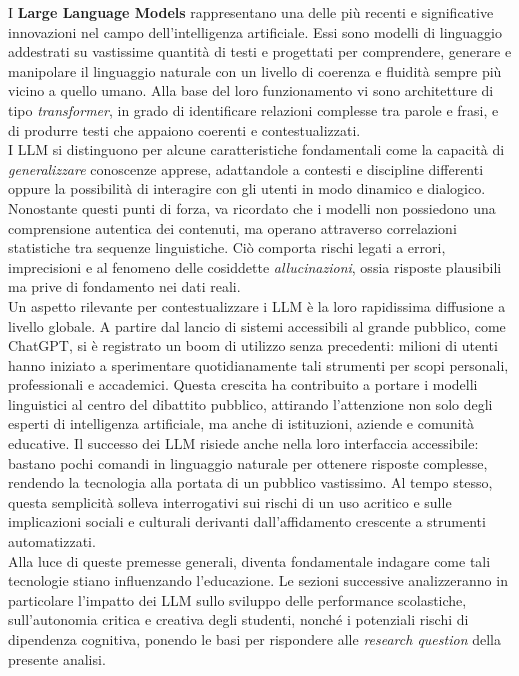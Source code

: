 \documentclass[a4paper,9pt]{article}
\begin{document}
I \textbf{Large Language Models} rappresentano una delle più recenti e significative innovazioni nel campo dell’intelligenza artificiale. Essi sono modelli di linguaggio addestrati su vastissime quantità di testi e progettati per comprendere, generare e manipolare il linguaggio naturale con un livello di coerenza e fluidità sempre più vicino a quello umano. Alla base del loro funzionamento vi sono architetture di tipo \emph{transformer}, in grado di identificare relazioni complesse tra parole e frasi, e di produrre testi che appaiono coerenti e contestualizzati.\\
I LLM si distinguono per alcune caratteristiche fondamentali come la capacità di \emph{generalizzare} conoscenze apprese, adattandole a contesti e discipline differenti oppure la possibilità di interagire con gli utenti in modo dinamico e dialogico. Nonostante questi punti di forza, va ricordato che i modelli non possiedono una comprensione autentica dei contenuti, ma operano attraverso correlazioni statistiche tra sequenze linguistiche. Ciò comporta rischi legati a errori, imprecisioni e al fenomeno delle cosiddette \emph{allucinazioni}, ossia risposte plausibili ma prive di fondamento nei dati reali.\\
Un aspetto rilevante per contestualizzare i LLM è la loro rapidissima diffusione a livello globale. A partire dal lancio di sistemi accessibili al grande pubblico, come ChatGPT, si è registrato un boom di utilizzo senza precedenti: milioni di utenti hanno iniziato a sperimentare quotidianamente tali strumenti per scopi personali, professionali e accademici. Questa crescita ha contribuito a portare i modelli linguistici al centro del dibattito pubblico, attirando l’attenzione non solo degli esperti di intelligenza artificiale, ma anche di istituzioni, aziende e comunità educative. Il successo dei LLM risiede anche nella loro interfaccia accessibile: bastano pochi comandi in linguaggio naturale per ottenere risposte complesse, rendendo la tecnologia alla portata di un pubblico vastissimo. Al tempo stesso, questa semplicità solleva interrogativi sui rischi di un uso acritico e sulle implicazioni sociali e culturali derivanti dall’affidamento crescente a strumenti automatizzati.\\
Alla luce di queste premesse generali, diventa fondamentale indagare come tali tecnologie stiano influenzando l’educazione. Le sezioni successive analizzeranno in particolare l’impatto dei LLM sullo sviluppo delle performance scolastiche, sull’autonomia critica e creativa degli studenti, nonché i potenziali rischi di dipendenza cognitiva, ponendo le basi per rispondere alle \emph{research question} della presente analisi.
\end{document}
